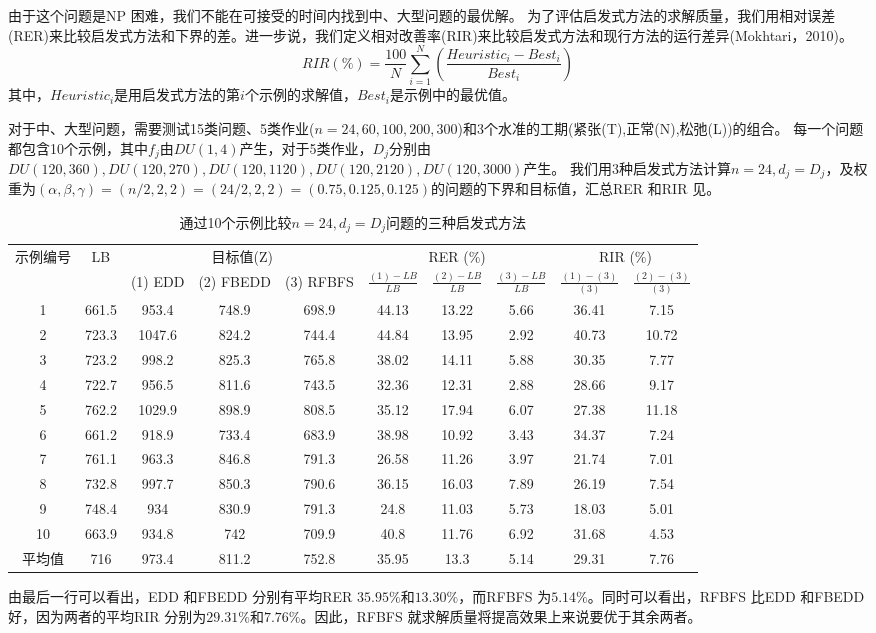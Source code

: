由于这个问题是NP 困难，我们不能在可接受的时间内找到中、大型问题的最优解。
为了评估启发式方法的求解质量，我们用相对误差(RER)来比较启发式方法和下界的差。进一步说，我们定义相对改善率(RIR)来比较启发式方法和现行方法的运行差异(Mokhtari，2010)。
\[RIR(\%) = \frac{100}{N}\sum_{i=1}^N \left(\frac{Heuristic_i - Best_i}{Best_i}\right)
\]
其中，$Heuristic_i$是用启发式方法的第$i$个示例的求解值，$Best_i$是示例中的最优值。

对于中、大型问题，需要测试15类问题、5类作业($n = 24,60,100,200,300$)和3个水准的工期(紧张(T),正常(N),松弛(L))的组合。
每一个问题都包含10个示例，其中$f_j$由$DU(1,4)$产生，对于5类作业，$D_j$分别由$DU(120,360),DU(120,270),DU(120,1120),DU(120,2120),DU(120,3000)$产生。
我们用3种启发式方法计算$n=24,d_j=D_j$，及权重为$(\alpha,\beta,\gamma)=(n/2,2,2)=(24/2,2,2)=(0.75,0.125,0.125)$的问题的下界和目标值，汇总RER 和RIR 见。
\begin{table}[h]
  \centering\xiaowu
  \caption{通过10个示例比较$n=24, d_j = D_j$问题的三种启发式方法\label{tab:comparen=24}}
    \begin{tabular}{cccccccccc}
    \toprule
    \multirow{2}[4]{*}{示例编号} & \multirow{2}[4]{*}{LB}   & \multicolumn{3}{c}{目标值(Z)} & \multicolumn{3}{c}{RER (\%)} & \multicolumn{2}{c}{RIR (\%)} \\
    \cline{3-10}
          &       & (1) EDD & (2) FBEDD & (3) RFBFS &$\frac{(1) - LB}{LB}$ & $\frac{(2) - LB}{LB}$ & $\frac{(3) - LB}{LB}$ &$\frac{(1) - (3)}{(3)}$ & $\frac{(2) - (3)}{(3)}$ \\
          \midrule 
    1     & 661.5 & 953.4 & 748.9 & 698.9 & 44.13 & 13.22 & 5.66  & 36.41 & 7.15 \\
    2     & 723.3 & 1047.6 & 824.2 & 744.4 & 44.84 & 13.95 & 2.92  & 40.73 & 10.72 \\
    3     & 723.2 & 998.2 & 825.3 & 765.8 & 38.02 & 14.11 & 5.88  & 30.35 & 7.77 \\
    4     & 722.7 & 956.5 & 811.6 & 743.5 & 32.36 & 12.31 & 2.88  & 28.66 & 9.17 \\
    5     & 762.2 & 1029.9 & 898.9 & 808.5 & 35.12 & 17.94 & 6.07  & 27.38 & 11.18 \\
    6     & 661.2 & 918.9 & 733.4 & 683.9 & 38.98 & 10.92 & 3.43  & 34.37 & 7.24 \\
    7     & 761.1 & 963.3 & 846.8 & 791.3 & 26.58 & 11.26 & 3.97  & 21.74 & 7.01 \\
    8     & 732.8 & 997.7 & 850.3 & 790.6 & 36.15 & 16.03 & 7.89  & 26.19 & 7.54 \\
    9     & 748.4 & 934   & 830.9 & 791.3 & 24.8  & 11.03 & 5.73  & 18.03 & 5.01 \\
    10    & 663.9 & 934.8 & 742   & 709.9 & 40.8  & 11.76 & 6.92  & 31.68 & 4.53 \\[3pt]
    平均值   & 716   & 973.4 & 811.2 & 752.8 & 35.95 & 13.3  & 5.14  & 29.31 & 7.76 \\
    \bottomrule
    \end{tabular}
\end{table}
由最后一行可以看出，EDD 和FBEDD 分别有平均RER $35.95\%\text{和}13.30\%$，而RFBFS 为$5.14\%$。同时可以看出，RFBFS 比EDD 和FBEDD 好，因为两者的平均RIR 分别为$29.31\%\text{和}7.76\%$。因此，RFBFS 就求解质量将提高效果上来说要优于其余两者。

